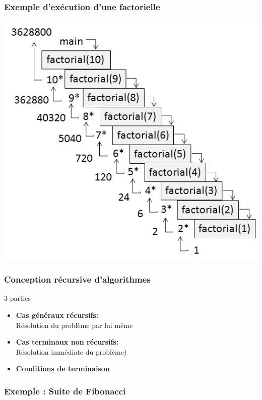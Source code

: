 \documentclass[table,handout,tikz,12pt,svgnames]{beamer}
\begin{document}
\begin{frame}[fragile=singleslide]
	\frametitle{Exemple d'exécution d'une factorielle}
	{\includegraphics[scale=0.50]{../common-images/RecursiveFactorial.jpg}}
\end{frame}

\begin{frame}[fragile=singleslide]
	\frametitle{Conception récursive d'algorithmes}
	\begin{block}{3 parties} %
		\begin{itemize}
			\item \textbf{Cas généraux récursifs:} \\ Résolution du problème par lui même
			\item \textbf{Cas terminaux non récursifs:} \\ Résolution immédiate du problème)
			\item \textbf{Conditions de terminaison}
		\end{itemize}
	\end{block}
\end{frame}

\begin{frame}[fragile=singleslide]
	\frametitle{Exemple : Suite de Fibonacci}
	\begin{verbatim}
	\end{verbatim}
\end{frame}
\end{document}

